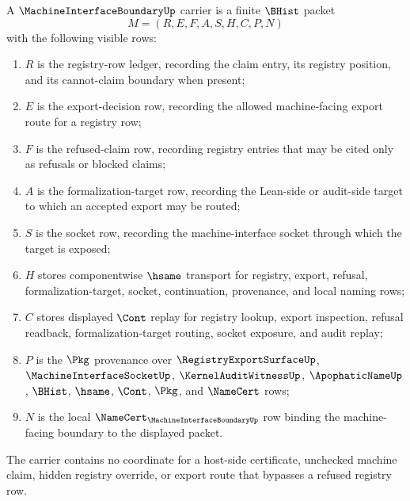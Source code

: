 \begin{definition}
\label{def:machine-interface-boundary-carrier}
A $\MachineInterfaceBoundaryUp$ carrier is a finite $\BHist$ packet
$$
M=(R,E,F,A,S,H,C,P,N)
$$
with the following visible rows:
\begin{enumerate}
\item $R$ is the registry-row ledger, recording the claim entry, its registry position, and its cannot-claim boundary when present;
\item $E$ is the export-decision row, recording the allowed machine-facing export route for a registry row;
\item $F$ is the refused-claim row, recording registry entries that may be cited only as refusals or blocked claims;
\item $A$ is the formalization-target row, recording the Lean-side or audit-side target to which an accepted export may be routed;
\item $S$ is the socket row, recording the machine-interface socket through which the target is exposed;
\item $H$ stores componentwise $\hsame$ transport for registry, export, refusal, formalization-target, socket, continuation, provenance, and local naming rows;
\item $C$ stores displayed $\Cont$ replay for registry lookup, export inspection, refusal readback, formalization-target routing, socket exposure, and audit replay;
\item $P$ is the $\Pkg$ provenance over $\RegistryExportSurfaceUp$, $\MachineInterfaceSocketUp$, $\KernelAuditWitnessUp$, $\ApophaticNameUp$, $\BHist$, $\hsame$, $\Cont$, $\Pkg$, and $\NameCert$ rows;
\item $N$ is the local $\NameCert_{\MachineInterfaceBoundaryUp}$ row binding the machine-facing boundary to the displayed packet.
\end{enumerate}
The carrier contains no coordinate for a host-side certificate, unchecked machine claim, hidden registry override, or export route that bypasses a refused registry row.
\end{definition}

